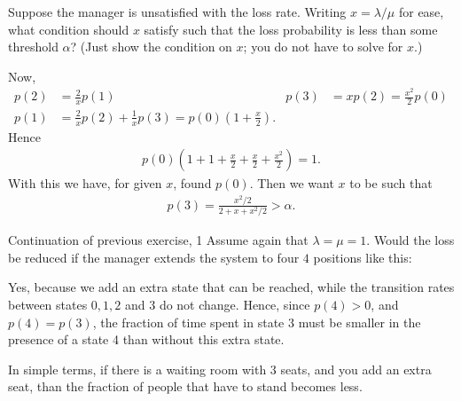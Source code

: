 \begin{exercise}[201807]{1}  Suppose the manager is unsatisfied with the loss rate. Writing $x=\lambda/\mu$ for ease, what condition should $x$ satisfy such that the loss probability is less than some threshold $\alpha$? (Just show the condition on $x$; you do not have to solve for $x$.) 
\begin{solution}
    Now, 
    \begin{align*}
      p(2) &= \frac 2 x p(1) & p(3) &= x p(2)= \frac{x^2}2 p(0) \\
p(1)&=\frac 2 x p(2) + \frac 1 x p(3) = p(0)(1+\frac x 2).
    \end{align*}
Hence
\begin{align*}
  p(0) (1+1 + \frac x 2 + \frac x 2 + \frac{x^2} 2)  =1.
\end{align*}
With this we have, for given $x$, found $p(0)$. Then we want $x$ to be such that
\begin{align*}
 p(3) = \frac{x^2/2}{2 + x + x^2/2} > \alpha.
\end{align*}

\end{solution}
\end{exercise}


\begin{exercise}[201807]{Continuation of previous exercise, 1} Assume again that $\lambda=\mu=1$. Would the loss be reduced if the manager extends the system to four $4$ positions like this:
\begin{center}
\end{center}
\begin{solution}
Yes, because we add an extra state that can be reached, while the transition rates between states $0, 1, 2$ and $3$ do not change. Hence, since $p(4)>0$, and $p(4)=p(3)$, the fraction of time spent in state 3 must be smaller in the presence of a state 4 than without this extra state. 

In simple terms, if there is a waiting room with 3 seats, and you add an extra seat, than the fraction of people that have to stand becomes less. 
\end{solution}
\end{exercise}


